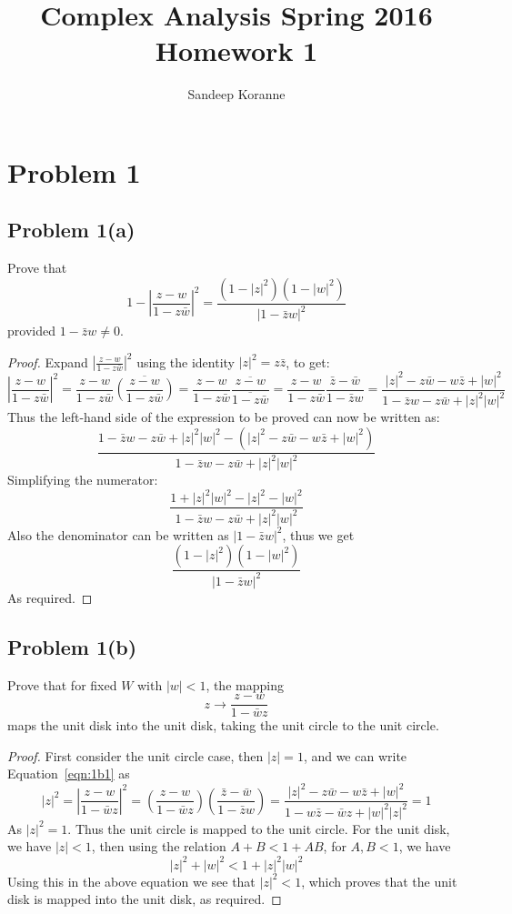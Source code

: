 \documentclass{article}[12pt]
\newtheorem{proof}{Proof}
\def\to{\rightarrow}
\begin{document}
\title{Complex Analysis Spring 2016 Homework 1}
\author{Sandeep Koranne}
\date{}
\maketitle

\section{Problem 1}
\subsection{Problem 1(a)}
Prove that
\[
1-\left|\frac{z-w}{1-z\bar{w}}\right|^2 = 
\frac{(1-|z|^2)(1-|w|^2)}{|1-\bar{z}w|^2}
\]
provided $1-\bar{z}w\ne 0$.
\begin{proof}
Expand $\left|\frac{z-w}{1-z\bar{w}}\right|^2$ using the identity
$|z|^2=z\bar{z}$, to get:
\[
\left|\frac{z-w}{1-z\bar{w}}\right|^2 = 
\frac{z-w}{1-z\bar{w}}\overline{\left(\frac{z-w}{1-z\bar{w}}\right)} =
\frac{z-w}{1-z\bar{w}}\frac{\overline{z-w}}{\overline{1-z\bar{w}}} =
\frac{z-w}{1-z\bar{w}}\frac{\bar{z}-\bar{w}}{1-\bar{z}w} = 
\frac{|z|^2-z\bar{w}-w\bar{z}+|w|^2}{1-\bar{z}w-z\bar{w}+|z|^2|w|^2}
\]
Thus the left-hand side of the expression to be proved can now be written as:
\[
\frac{1-\bar{z}w-z\bar{w}+|z|^2|w|^2-(|z|^2-z\bar{w}-w\bar{z}+|w|^2)}
{1-\bar{z}w-z\bar{w}+|z|^2|w|^2}
\]
Simplifying the numerator:
\[
\frac{1+|z|^2|w|^2-|z|^2-|w|^2}
{1-\bar{z}w-z\bar{w}+|z|^2|w|^2}
\]
Also the denominator can be written as $|1-\bar{z}w|^2$, thus we get
\[
\frac{(1-|z|^2)(1-|w|^2)}{|1-\bar{z}w|^2}
\]
As required.
\end{proof}

\subsection{Problem 1(b)}
Prove that for fixed $W$ with $|w|<1$, the mapping
\begin{equation}
z\to \frac{z-w}{1-\bar{w}z} \label{eqn:1b1}
\end{equation}
maps the unit disk into the unit disk, taking the unit circle to
the unit circle.
\begin{proof}
First consider the unit circle case, then $|z|=1$, and we can write
Equation~\ref{eqn:1b1} as
\[
|z|^2=|\frac{z-w}{1-\bar{w}z}|^2 = \left(\frac{z-w}{1-\bar{w}z}\right)
\left(\frac{\bar{z}-\bar{w}}{1-\bar{z}w}\right) =
\frac{|z|^2-z\bar{w}-w\bar{z}+|w|^2}{1-w\bar{z}-\bar{w}z+|w|^2|z|^2}=1
\]
As $|z|^2=1$. Thus the unit circle is mapped to the unit circle.
For the unit disk, we have $|z|<1$, then using the relation
$A+B < 1+AB$, for $A,B < 1$, we have
\[
|z|^2+|w|^2 < 1 + |z|^2|w|^2
\]
Using this in the above equation we see that $|z|^2<1$, which
proves that the unit disk is mapped into the unit disk, as required.
\end{proof}
\end{document}
